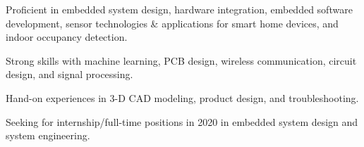 

\begin{cvparagraph}

    \vspace{12pt}
\begin{cvitems}
    \setlength{\itemsep}{2pt}
    \item Proficient in embedded system design, hardware integration, embedded software development, sensor technologies \& applications for smart home devices, and indoor occupancy detection.
    \item Strong skills with machine learning, PCB design, wireless communication, circuit design, and signal processing.
    \item Hand-on experiences in 3-D CAD modeling, product design, and troubleshooting.
    \item Seeking for internship/full-time positions in 2020 in embedded system design and system engineering.
\end{cvitems}
\end{cvparagraph}
